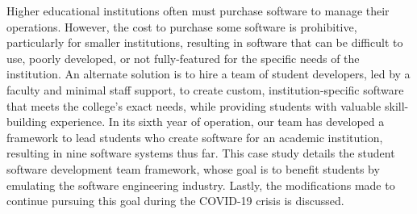 Higher educational institutions often must purchase software to manage their operations. However, the cost to purchase some  software is prohibitive, particularly for smaller institutions, resulting in software that can be difficult to use, poorly developed, or not fully-featured for the specific needs of the institution. An alternate solution is to hire a team of student developers, led by a faculty and minimal staff support, to create custom, institution-specific software that meets the college's exact needs, while providing students with valuable skill-building experience. In its sixth year of operation, our team has developed a framework to lead students who create software for an academic institution, resulting in nine software systems thus far. This case study details the student software development team framework, whose goal is to benefit students by emulating the software engineering industry. Lastly, the modifications made to continue pursuing this goal during the COVID-19 crisis is discussed.
